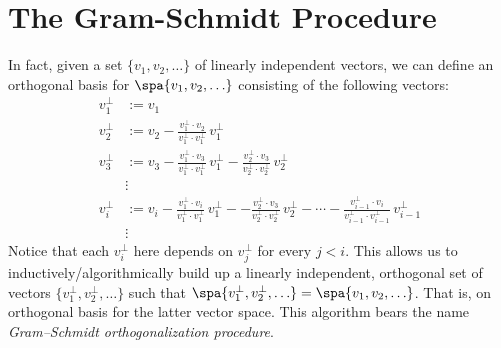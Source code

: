 \section{The Gram-Schmidt Procedure}
In fact, given a set $\{v_1, v_2, \ldots \}$ of linearly independent vectors, we can define an orthogonal basis for $\spa \{v_1,v_2, \ldots \}$ consisting of the following vectors:
\begin{align*}
v_1^\perp&:=v_1 \\
v_2^\perp &:= v_2 - \frac{v_1^\perp\cdot v_2}{v_1^\perp\cdot v_1^\perp}\,v_1^\perp \\
v_3^\perp &:= v_3 - \frac{v_1^\perp\cdot v_3}{v_1^\perp\cdot v_1^\perp}\,v_1^\perp - \frac{v_2^\perp\cdot v_3}{v_2^\perp\cdot v_2^\perp}\,v_2^\perp\\
&\vdots \\
v_i^\perp%
 &:= v_i - \frac{v_1^\perp\cdot v_i}{v_1^\perp\cdot v_1^\perp}\,v_1^\perp -  
 - \frac{v_2^\perp\cdot v_3}{v_2^\perp\cdot v_2^\perp}\,v_2^\perp -\cdots
 - \frac{v_{i-1}^\perp\cdot v_i}{v_{i-1}^\perp\cdot v_{i-1}^\perp}\,v_{i-1}^\perp\\
&\vdots
\end{align*}
Notice that each $v_i^\perp$ here depends on  $v_j^\perp$ for every $j<i$.  This allows us to inductively/algorithmically build up a linearly independent, orthogonal set of vectors 
$\{v_1^\perp,v_2^\perp, \ldots \}$ 
such that 
$\spa \{v_1^\perp,v_2^\perp, \ldots \}=\spa \{v_1, v_2, \ldots \}$. That is, on orthogonal basis for the latter vector space. This algorithm bears the name \emph{Gram--Schmidt orthogonalization procedure}\label{GramSchmidt}.

